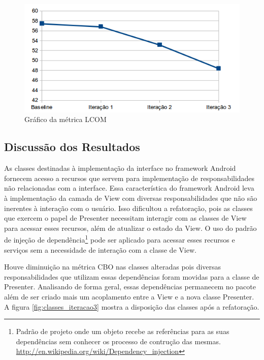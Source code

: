 \documentclass[conference]{IEEEtran}
\begin{document}
\begin{figure}[!htb]
	\begin{center}
		\includegraphics[scale=0.5]{img/lcom.png}
	\end{center}
	\caption{\label{fig:lcom} Gráfico da métrica LCOM}   
	
\end{figure}



\subsection{Discussão dos Resultados} 




As classes destinadas à implementação da interface no framework Android fornecem
acesso a recursos que servem para implementação de responsabilidades não
relacionadas com a interface. Essa característica do framework Android leva à
implementação da camada de View com diversas responsabilidades que não são
inerentes à interação com o usuário. Isso dificultou a refatoração, pois as
classes que exercem o papel de Presenter necessitam interagir com as classes de
View para acessar esses recursos, além de atualizar o estado da View. O uso do
padrão de injeção de
dependência\footnote{Padrão
de projeto onde um objeto recebe as referências para as suas dependências sem
conhecer os processo de contrução das mesmas.
\url{http://en.wikipedia.org/wiki/Dependency_injection}}
pode ser aplicado para acessar esses recursos e serviços sem a necessidade de
interação com a classe de View.

Houve diminuição na métrica CBO nas classes alteradas pois diversas
responsabilidades que utilizam essas dependências foram movidas para a classe de
Presenter. Analisando de forma geral, essas dependências permanecem no pacote
além de ser criado mais um acoplamento entre a View e a nova classe Presenter.
A figura \ref{fig:classes_iteracao3} mostra a disposição das classes após a
refatoração.
\end{document}

